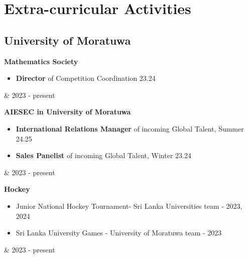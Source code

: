 \documentclass[10pt, a4paper]{article}
\newenvironment{highlights}{
        \begin{itemize}[
                topsep=0pt,
                parsep=0.10 cm,
                partopsep=0pt,
                itemsep=0pt,
                after=\vspace{-1\baselineskip},
                leftmargin=0.4 cm + 3pt
            ]
    }{
        \end{itemize}
    } %
\let\originalTabularx\tabularx
\let\originalEndTabularx\endtabularx
\renewenvironment{tabularx}{\bgroup\centering\originalTabularx}{\originalEndTabularx\par\egroup}
\begin{document}
     \section{Extra-curricular Activities}
	\subsection{University of Moratuwa}
		\begin{tabularx}{\textwidth-0.4 cm-0.13cm}{K{0.2 cm} R{4.1 cm}}
            \textbf{Mathematics Society}
            \vspace{0.10 cm}
            \begin{highlights}
                \item \textbf{Director} of Competition Coordination 23.24
            \end{highlights}
            &
            2023 - present
           \end{tabularx}
			
		\vspace{0.2 cm}
		\begin{tabularx}{\textwidth-0.4 cm-0.13cm}{K{0.2 cm} R{4.1 cm}}
            \textbf{AIESEC in University of Moratuwa}
            \vspace{0.10 cm}
            \begin{highlights}
	        \item \textbf{International Relations Manager} of incoming Global Talent, Summer 24.25
	        \item \textbf{Sales Panelist} of incoming Global Talent, Winter 23.24
	        \end{highlights}
            &
            2023 - present
           \end{tabularx}
			
		\vspace{0.2 cm}	
		\begin{tabularx}{\textwidth-0.4 cm-0.13cm}{K{0.2 cm} R{4.1 cm}}
            \textbf{Hockey}
            \vspace{0.10 cm}
             \begin{highlights}
	        \item Junior National Hockey Tournament- Sri Lanka Universities team - 2023, 2024
	        \item Sri Lanka University Games - University of Moratuwa team - 2023
	        \end{highlights}
            &
            2023 - present
           \end{tabularx}
\end{document}
